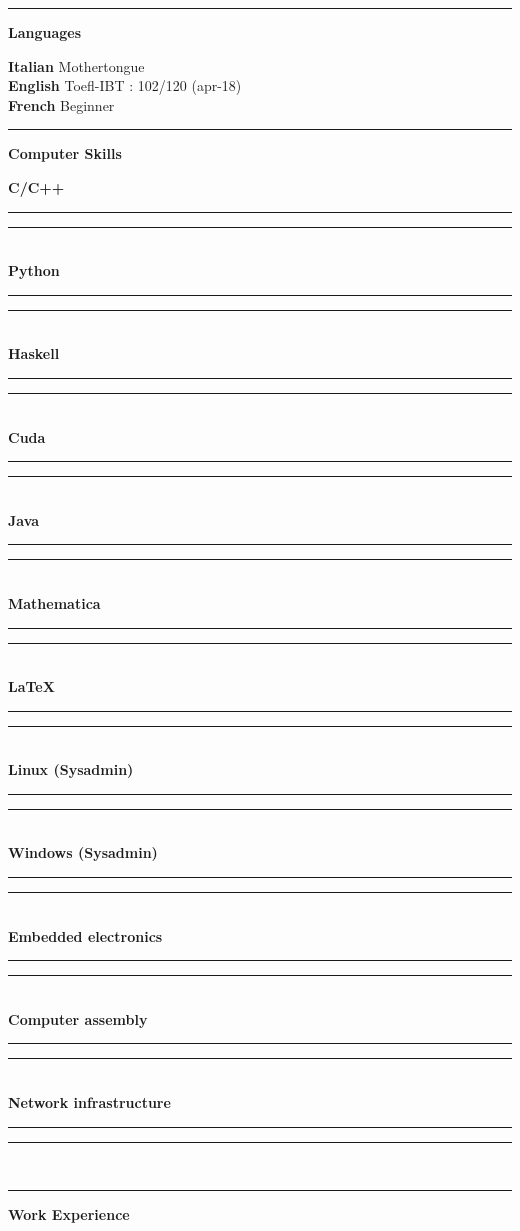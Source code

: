 \documentclass[a4paper]{article}
\newcommand{\crule}[3][black]{\textcolor{#1}{\rule{#2}{#3}}}
\newcommand{\progbar}[4][black]{\crule[#1]{#3}{#4}\crule[#1!10!white!90]{#2}{#4}}
\newcommand{\block}[1]{\hrule \vspace{0.2cm} \textbf{\Large #1} \vspace{0.2cm}}
\newcommand{\skill}[2]{\textbf{#1} \hfill #2 \\}
\newcommand{\skillbar}[4]{\textbf{#1} \hfill \progbar{#2}{#3}{#4} \\}
\begin{document}
\begin{minipage}[t]{0.375\columnwidth}











    \block{Languages} 
    
    
    \skill{Italian}{Mothertongue}
    \skill{English}{Toefl-IBT : 102/120 (apr-18)}
    \skill{French}{Beginner}





    \block{Computer Skills} 
    
    
    \skillbar{C/C++}
    {1.4cm}
    {0.6cm}
    {0.25cm}
    \skillbar{Python}
    {1.1cm}
    {0.9cm}
    {0.25cm}
    \skillbar{Haskell}
    {1.5cm}
    {0.5cm}
    {0.25cm}
    \skillbar{Cuda}
    {1.1cm}
    {0.9cm}
    {0.25cm}
    \skillbar{Java}
    {1.2cm}
    {0.8cm}
    {0.25cm}
    \skillbar{Mathematica}
    {1.4cm}
    {0.6cm}
    {0.25cm}
    \skillbar{\LaTeX}
    {0.5cm}
    {1.5cm}
    {0.25cm}
    \skillbar{Linux (Sysadmin)}
    {0.7cm}
    {1.3cm}
    {0.25cm}
    \skillbar{Windows (Sysadmin)}
    {0.7cm}
    {1.3cm}
    {0.25cm}
    \skillbar{Embedded electronics}
    {1.5cm}
    {0.5cm}
    {0.25cm}
    \skillbar{Computer assembly}
    {1.0cm}
    {1.0cm}
    {0.25cm}
    \skillbar{Network infrastructure}
    {1.6cm}
    {0.4cm}
    {0.25cm}




\end{minipage}




{}





    \block{Work Experience}
\end{document}
